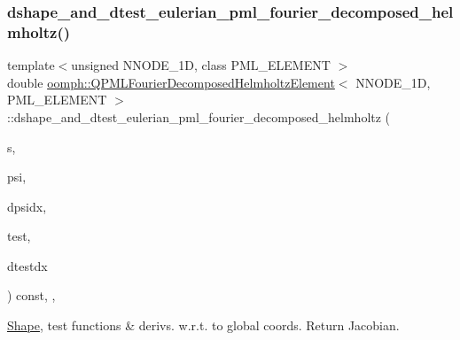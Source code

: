 \mbox{\label{classoomph_1_1QPMLFourierDecomposedHelmholtzElement_adb66973c00aa3b1b367fdd890e4dfd68}} 
\subsubsection{\texorpdfstring{dshape\+\_\+and\+\_\+dtest\+\_\+eulerian\+\_\+pml\+\_\+fourier\+\_\+decomposed\+\_\+helmholtz()}{dshape\_and\_dtest\_eulerian\_pml\_fourier\_decomposed\_helmholtz()}}
{\footnotesize\ttfamily template$<$unsigned N\+N\+O\+D\+E\+\_\+1D, class P\+M\+L\+\_\+\+E\+L\+E\+M\+E\+NT $>$ \\
double \hyperlink{classoomph_1_1QPMLFourierDecomposedHelmholtzElement}{oomph\+::\+Q\+P\+M\+L\+Fourier\+Decomposed\+Helmholtz\+Element}$<$ N\+N\+O\+D\+E\+\_\+1D, P\+M\+L\+\_\+\+E\+L\+E\+M\+E\+NT $>$\+::dshape\+\_\+and\+\_\+dtest\+\_\+eulerian\+\_\+pml\+\_\+fourier\+\_\+decomposed\+\_\+helmholtz (\begin{DoxyParamCaption}\item[{const \hyperlink{classoomph_1_1Vector}{Vector}$<$ double $>$ \&}]{s,  }\item[{\hyperlink{classoomph_1_1Shape}{Shape} \&}]{psi,  }\item[{\hyperlink{classoomph_1_1DShape}{D\+Shape} \&}]{dpsidx,  }\item[{\hyperlink{classoomph_1_1Shape}{Shape} \&}]{test,  }\item[{\hyperlink{classoomph_1_1DShape}{D\+Shape} \&}]{dtestdx }\end{DoxyParamCaption}) const\hspace{0.3cm}{\ttfamily [inline]}, {\ttfamily [protected]}, {\ttfamily [virtual]}}

\hyperlink{classoomph_1_1Shape}{Shape}, test functions \& derivs. w.\+r.\+t. to global coords. Return Jacobian.


